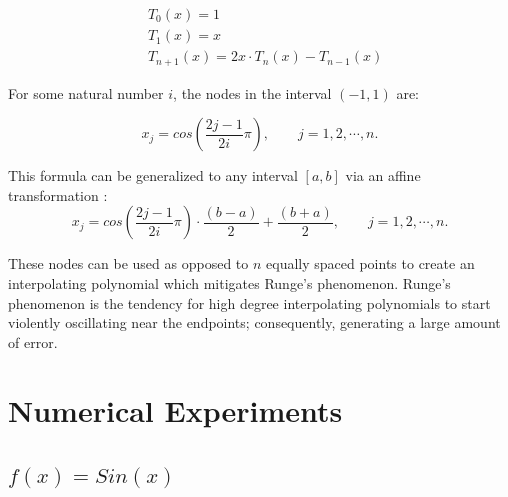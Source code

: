 \documentclass[11pt]{article}%
\begin{document}
\begin{equation}
\begin{split} %
&T_0(x) = 1\\
&T_1(x) = x\\
&T_{n + 1}(x) = 2x \cdot T_n(x) - T_{n - 1}(x)
\end{split}
\end{equation}

For some natural number $i$, the nodes in the interval $(-1, 1)$ are:

\begin{equation} \label{cnode1}
x_j = cos(\frac{2j - 1}{2i}\pi), \qquad j = 1, 2, \cdots, n.
\end{equation}

This formula can be generalized to any interval $[a, b]$ via an affine transformation \cite{SGW}:
\begin{equation} \label{cnode1}
x_j = cos(\frac{2j - 1}{2i}\pi)\cdot \frac{(b-a)}{2} + \frac{(b+a)}{2}, \qquad j = 1, 2, \cdots, n.
\end{equation}

These nodes can be used as opposed to $n$ equally spaced points to create an interpolating polynomial which mitigates Runge's phenomenon. Runge's phenomenon is the tendency for high degree interpolating polynomials to start violently oscillating near the endpoints; consequently, generating a large amount of error.

\clearpage
\newpage
\section*{Numerical Experiments}

\subsection{$f\left(x\right) = Sin(x)$}
\vspace{5pt}

\end{document}
